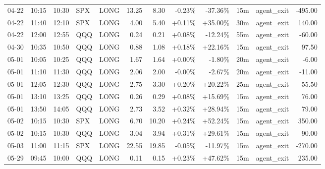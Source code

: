 \documentclass[11pt,a4paper]{article}
\begin{document}
\begin{center}
\begin{longtable}{>{\color{txtmain}}l l l l l r r r r r >{\color{txtmain}}l r}
04-22 & 10:15 & 10:30 & SPX & LONG & 13.25 & 8.30 & \textcolor{lossred}{-0.23\%} & \textcolor{lossred}{-37.36\%} & 15m & agent\_exit & \textcolor{lossred}{-495.00} \\
04-22 & 11:40 & 12:10 & SPX & LONG & 4.00 & 5.40 & \textcolor{wingreen}{+0.11\%} & \textcolor{wingreen}{+35.00\%} & 30m & agent\_exit & \textcolor{wingreen}{140.00} \\
04-22 & 12:00 & 12:55 & QQQ & LONG & 0.24 & 0.21 & \textcolor{wingreen}{+0.08\%} & \textcolor{lossred}{-12.24\%} & 55m & agent\_exit & \textcolor{lossred}{-60.00} \\
04-30 & 10:35 & 10:50 & QQQ & LONG & 0.88 & 1.08 & \textcolor{wingreen}{+0.18\%} & \textcolor{wingreen}{+22.16\%} & 15m & agent\_exit & \textcolor{wingreen}{97.50} \\
05-01 & 10:05 & 10:25 & QQQ & LONG & 1.67 & 1.64 & \textcolor{wingreen}{+0.00\%} & \textcolor{lossred}{-1.80\%} & 20m & agent\_exit & \textcolor{lossred}{-6.00} \\
05-01 & 11:10 & 11:30 & QQQ & LONG & 2.06 & 2.00 & \textcolor{lossred}{-0.00\%} & \textcolor{lossred}{-2.67\%} & 20m & agent\_exit & \textcolor{lossred}{-11.00} \\
05-01 & 12:05 & 12:30 & QQQ & LONG & 2.75 & 3.30 & \textcolor{wingreen}{+0.20\%} & \textcolor{wingreen}{+20.22\%} & 25m & agent\_exit & \textcolor{wingreen}{55.50} \\
05-01 & 13:10 & 13:25 & QQQ & LONG & 0.26 & 0.29 & \textcolor{wingreen}{+0.08\%} & \textcolor{wingreen}{+15.69\%} & 15m & agent\_exit & \textcolor{wingreen}{76.00} \\
05-01 & 13:50 & 14:05 & QQQ & LONG & 2.73 & 3.52 & \textcolor{wingreen}{+0.32\%} & \textcolor{wingreen}{+28.94\%} & 15m & agent\_exit & \textcolor{wingreen}{79.00} \\
05-02 & 10:15 & 10:30 & SPX & LONG & 6.70 & 10.20 & \textcolor{wingreen}{+0.24\%} & \textcolor{wingreen}{+52.24\%} & 15m & agent\_exit & \textcolor{wingreen}{350.00} \\
05-02 & 10:15 & 10:30 & QQQ & LONG & 3.04 & 3.94 & \textcolor{wingreen}{+0.31\%} & \textcolor{wingreen}{+29.61\%} & 15m & agent\_exit & \textcolor{wingreen}{90.00} \\
05-03 & 11:00 & 11:15 & SPX & LONG & 22.55 & 19.85 & \textcolor{lossred}{-0.05\%} & \textcolor{lossred}{-11.97\%} & 15m & agent\_exit & \textcolor{lossred}{-270.00} \\
05-29 & 09:45 & 10:00 & QQQ & LONG & 0.11 & 0.15 & \textcolor{wingreen}{+0.23\%} & \textcolor{wingreen}{+47.62\%} & 15m & agent\_exit & \textcolor{wingreen}{235.00} \\

\end{longtable}
\end{center}
\end{document}
